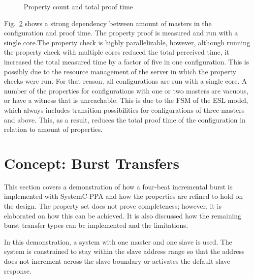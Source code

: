 \begin{figure}[hbt]
\begin{subfigure}{.5\textwidth}
\label{fig:sub4}
\end{subfigure}
\caption{Property count and total proof time}
\label{fig:proof}
\end{figure}

Fig.~\ref{fig:proof} shows a strong dependency between amount of masters in the configuration and proof time. The property proof is measured and run with a single core.The property check is highly parallelizable, however, although running the property check with multiple cores reduced the total perceived time, it increased the total measured time by a factor of five in one configuration. This is possibly due to the resource management of the server in which the property checks were run. For that reason, all configurations are run with a single core. A number of the properties for configurations with one or two masters are vacuous, or have a witness that is unreachable. This is due to the FSM of the ESL model, which always includes transition possibilities for configurations of three masters and above. This, as a result, reduces the total proof time of the configuration in relation to amount
of properties.
\section{Concept: Burst Transfers}
\label{sec:burst}
This section covers a demonstration of how a four-beat incremental burst is implemented with SystemC-PPA and how the properties are refined to hold on the design.
The property set does not prove completeness; however, it is elaborated on how this can be achieved. It is also discussed how the remaining burst transfer types can be implemented and the limitations. \par
In this demonstration, a system with one master and one slave is used. The system is constrained to stay within the slave address range so that the address does not increment across the slave boundary or activates the default slave response. 

